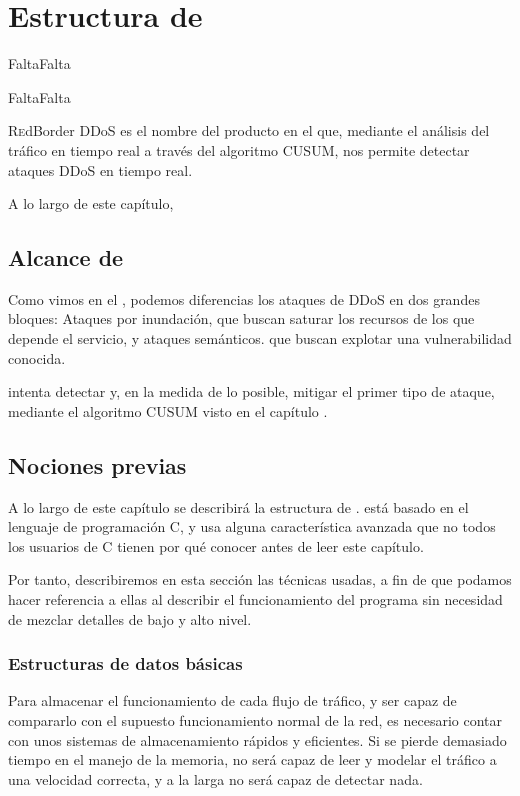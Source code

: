 \chapter{Estructura de \redborderddos}
\pagestyle{esitscCD}
\epigraph{  FaltaFalta }{FaltaFalta}

\lettrine[lraise=-0.1, lines=2, loversize=0.25]{R}edBorder DDoS es el nombre del producto en el 
que, mediante el análisis del tráfico en tiempo real a través del algoritmo \gls{CUSUM}, nos permite detectar ataques 
\gls{DDoS} en tiempo real.

A lo largo de este capítulo, %

\section{Alcance de \redborderddos} %
Como vimos en el , podemos diferencias los ataques de \gls{DDoS} en dos grandes bloques: 
Ataques por inundación, que buscan saturar los recursos de los que depende el servicio, y ataques semánticos. que 
buscan explotar una vulnerabilidad conocida.

\redborderddos{} intenta detectar y, en la medida de lo posible, mitigar el primer tipo de ataque, mediante el 
algoritmo \gls{CUSUM} visto en el capítulo . 

\section{Nociones previas}


A lo largo de este capítulo se describirá la estructura de \redborderddos. \redborderddos{} está basado en el lenguaje 
de programación C, y usa alguna característica avanzada que no todos los usuarios de C tienen por qué conocer antes de 
leer este capítulo.

Por tanto, describiremos en esta sección las técnicas usadas, a fin de que podamos hacer referencia a ellas al 
describir el funcionamiento del programa sin necesidad de mezclar detalles de bajo y alto nivel.

\subsection{Estructuras de datos básicas}
Para almacenar el funcionamiento de cada flujo de tráfico, y ser capaz de compararlo con el supuesto funcionamiento 
normal de la red, es necesario contar con unos sistemas de almacenamiento rápidos y eficientes. Si se pierde demasiado 
tiempo en el manejo de la memoria, \redborderddos{} no será capaz de leer y modelar el tráfico a una velocidad 
correcta, y a la larga no será capaz de detectar nada.

